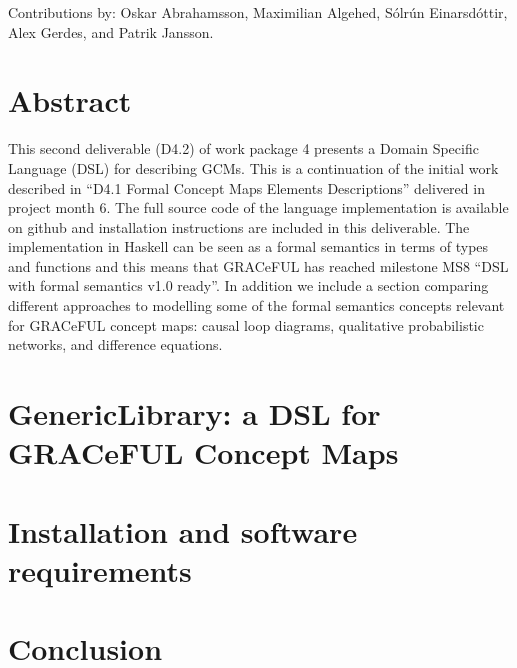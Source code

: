 \documentclass[]{article}
\begin{document}
Contributions by: Oskar Abrahamsson, Maximilian Algehed, Sólrún
Einarsdóttir, Alex Gerdes, and Patrik Jansson.

\vfill

\setcounter{tocdepth}{2}
\tableofcontents

\vfill

\newpage

\section*{Abstract}\label{abstract}

This second deliverable (D4.2) of work package 4 presents a Domain
Specific Language (DSL) for describing \acp{GCM}.
%
This is a continuation of the initial work described in ``D4.1 Formal
Concept Maps Elements Descriptions'' delivered in project month 6.
%
The full source code of the language implementation is available on
github and installation instructions are included in this deliverable.
%
The implementation in Haskell can be seen as a formal semantics in
terms of types and functions and this means that GRACeFUL has reached
milestone MS8 ``DSL with formal semantics v1.0 ready''.
%
In addition we include a section comparing different approaches to
modelling some of the formal semantics concepts relevant for GRACeFUL
concept maps: causal loop diagrams, qualitative probabilistic
networks, and difference equations.





\section{GenericLibrary: a DSL for GRACeFUL Concept Maps}
\label{sec:gl}





\section{Installation and software requirements}
\label{install-and-reqs}






\section{Conclusion}
\end{document}
